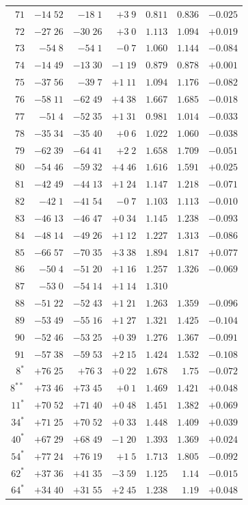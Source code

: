 \begin{center}
{{\begin{tabular}{r||r|r|r||r|r|r}
$71$&$-14\;52$&$-18\;1$&$+3\;9$&$0.811$&$0.836$&$-0.025$\\
$72$&$-27\;26$&$-30\;26$&$+3\;0$&$1.113$&$1.094$&$+0.019$\\
$73$&$-54\;8$&$-54\;1$&$-0\;7$&$1.060$&$1.144$&$-0.084$\\
$74$&$-14\;49$&$-13\;30$&$-1\;19$&$0.879$&$0.878$&$+0.001$\\
$75$&$-37\;56$&$-39\;7$&$+1\;11$&$1.094$&$1.176$&$-0.082$\\
$76$&$-58\;11$&$-62\;49$&$+4\;38$&$1.667$&$1.685$&$-0.018$\\
$77$&$-51\;4$&$-52\;35$&$+1\;31$&$0.981$&$1.014$&$-0.033$\\
$78$&$-35\;34$&$-35\;40$&$+0\;6$&$1.022$&$1.060$&$-0.038$\\
$79$&$-62\;39$&$-64\;41$&$+2\;2$&$1.658$&$1.709$&$-0.051$\\
$80$&$-54\;46$&$-59\;32$&$+4\;46$&$1.616$&$1.591$&$+0.025$\\[2pt]
$81$&$-42\;49$&$-44\;13$&$+1\;24$&$1.147$&$1.218$&$-0.071$\\
$82$&$-42\;1$&$-41\;54$&$-0\;7$&$1.103$&$1.113$&$-0.010$\\
$83$&$-46\;13$&$-46\;47$&$+0\;34$&$1.145$&$1.238$&$-0.093$\\
$84$&$-48\;14$&$-49\;26$&$+1\;12$&$1.227$&$1.313$&$-0.086$\\
$85$&$-66\;57$&$-70\;35$&$+3\;38$&$1.894$&$1.817$&$+0.077$\\
$86$&$-50\;4$&$-51\;20$&$+1\;16$&$1.257$&$1.326$&$-0.069$\\
$87$&$-53\;0$&$-54\;14$&$+1\;14$&$1.310$&&\\
$88$&$-51\;22$&$-52\;43$&$+1\;21$&$1.263$&$1.359$&$-0.096$\\
$89$&$-53\;49$&$-55\;16$&$+1\;27$&$1.321$&$1.425$&$-0.104$\\
$90$&$-52\;46$&$-53\;25$&$+0\;39$&$1.276$&$1.367$&$-0.091$\\[2pt]
$91$&$-57\;38$&$-59\;53$&$+2\;15$&$1.424$&$1.532$&$-0.108$\\[2pt]
$8^{\ast}$&$+76\;25$&$+76\;3$&$+0\;22$&$1.678$&$1.75$&$-0.072$\\
$8^{\ast\ast}$&$+73\;46$&$+73\;45$&$+0\;1$&$1.469$&$1.421$&$+0.048$\\
$11^{\ast}$&$+70\;52$&$+71\;40$&$+0\;48$&$1.451$&$1.382$&$+0.069$\\
$34^{\ast}$&$+71\;25$&$+70\;52$&$+0\;33$&$1.448$&$1.409$&$+0.039$\\
$40^{\ast}$&$+67\;29$&$+68\;49$&$-1\;20$&$1.393$&$1.369$&$+0.024$\\
$54^{\ast}$&$+77\;24$&$+76\;19$&$+1\;5$&$1.713$&$1.805$&$-0.092$\\
$62^{\ast}$&$+37\;36$&$+41\;35$&$-3\;59$&$1.125$&$1.14$&$-0.015$\\
$64^{\ast}$&$+34\;40$&$+31\;55$&$+2\;45$&$1.238$&$1.19$&$+0.048$\\
\end{tabular}
}
}
\end{center}
\endgroup
{}
\par\clearpage
